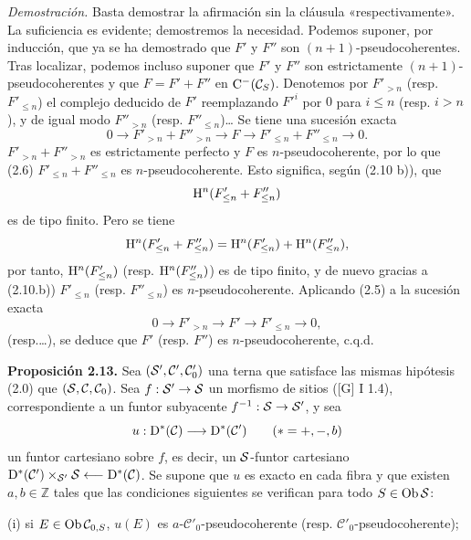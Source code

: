 \emph{Demostración.} Basta demostrar la afirmación sin la cláusula «respectivamente». La suficiencia es evidente; demostremos la necesidad. Podemos suponer, por inducción, que ya se ha demostrado que \(F'\) y \(F''\) son \((n+1)\)-pseudocoherentes. Tras localizar, podemos incluso suponer que \(F'\) y \(F''\) son estrictamente \((n+1)\)-pseudocoherentes y que \(F=F'+F''\) en \(\Cpx^-(\mathcal C_S)\). Denotemos por \(F'_{>n}\) (resp. \(F'_{\leq n}\)) el complejo deducido de \(F'\) reemplazando \(F'^i\) por \(0\) para \(i\leq n\) (resp. \(i>n\)), y de igual modo \(F''_{>n}\) (resp. \(F''_{\leq n}\))\dots{} Se tiene una sucesión exacta
\[
  0\longrightarrow F'_{>n}+F''_{>n}\longrightarrow F
  \longrightarrow F'_{\leq n}+F''_{\leq n}\longrightarrow 0 .
\]
\(F'_{>n}+F''_{>n}\) es estrictamente perfecto y \(F\) es \(n\)-pseudocoherente, por lo que (2.6) \(F'_{\leq n}+F''_{\leq n}\) es \(n\)-pseudocoherente. Esto significa, según (2.10 b)), que
\[
  \Ho^n(F'_{\leq n}+F''_{\leq n})
\]
es de tipo finito. Pero se tiene
\[
  \Ho^n(F'_{\leq n}+F''_{\leq n})
  =\Ho^n(F'_{\leq n})+\Ho^n(F''_{\leq n}),
\]
por tanto, \(\Ho^n(F'_{\leq n})\) (resp. \(\Ho^n(F''_{\leq n})\)) es de tipo finito, y de nuevo gracias a (2.10.b)) \(F'_{\leq n}\) (resp. \(F''_{\leq n}\)) es \(n\)-pseudocoherente. Aplicando (2.5) a la sucesión exacta
\[
  0\longrightarrow F'_{>n}\longrightarrow F'\longrightarrow F'_{\leq n}\longrightarrow 0,
\]
(resp.\dots), se deduce que \(F'\) (resp. \(F''\)) es \(n\)-pseudocoherente, c.q.d.

\textbf{Proposición 2.13.} Sea \((\sisi{S'}{\mathcal S'},\mathcal C',\mathcal C'_0)\) una terna que satisface las mismas hipótesis (2.0) que \((\sisi{S}{\mathcal S},\mathcal C,\mathcal C_0)\). Sea \(f:\sisi{S'}{\mathcal S'}\to \sisi{S}{\mathcal S}\) un morfismo de sitios ([G] I 1.4), correspondiente a un funtor subyacente \(f^{-1}:\sisi{S}{\mathcal S}\to \sisi{S'}{\mathcal S'}\), y sea
\[
  u:\Dpx^*(\mathcal C)\longrightarrow \Dpx^*(\mathcal C')\qquad (*=+,-,b)
\]
un funtor cartesiano sobre \(f\), es decir, un \(\sisi{S}{\mathcal S}\)-funtor cartesiano \(\Dpx^*(\mathcal C')\times_{\sisi{S'}{\mathcal S'}}\sisi{S}{\mathcal S}\longleftarrow\Dpx^*(\mathcal C)\). Se supone que \(u\) es exacto en cada fibra y que existen \(a,b\in\mathbb Z\) tales que las condiciones siguientes se verifican para todo \(S\in\Ob \sisi{S}{\mathcal S}\):

(i) si \(E\in\Ob\mathcal C_{0,S}\), \(u(E)\) es \(a\)-\(\mathcal C'_0\)-pseudocoherente (resp. \(\mathcal C'_0\)-pseudocoherente);

